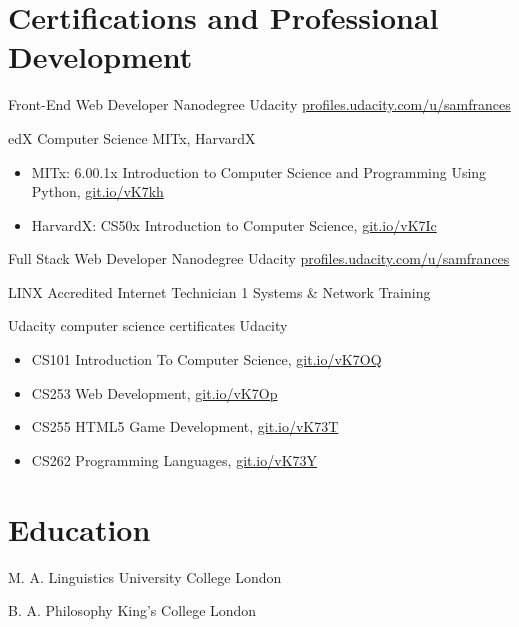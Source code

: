 \documentclass[10pt,a4paper,sans]{moderncv} %
\begin{document}

\section{Certifications and Professional Development}

    {Front-End Web Developer Nanodegree}
    {Udacity}{}
    { \href{ https://profiles.udacity.com/u/samfrances }{ profiles.udacity.com/u/samfrances } }
    {}

    {edX Computer Science}
    {MITx, HarvardX}{}
    {}
    {        \begin{itemize}
            \item{ MITx: 6.00.1x Introduction to Computer Science and Programming Using Python, \href{ https://git.io/vK7kh }{ git.io/vK7kh } }
            \item{ HarvardX: CS50x Introduction to Computer Science, \href{ https://git.io/vK7Ic }{ git.io/vK7Ic } }
        \end{itemize}
}

    {Full Stack Web Developer Nanodegree}
    {Udacity}{}
    { \href{ https://profiles.udacity.com/u/samfrances }{ profiles.udacity.com/u/samfrances } }
    {}

    {LINX Accredited Internet Technician 1}
    {Systems \& Network Training}{}
    {}
    {}

    {Udacity computer science certificates}
    {Udacity}{}
    {}
    {        \begin{itemize}
            \item{ CS101 Introduction To Computer Science, \href{ https://git.io/vK7OQ }{ git.io/vK7OQ } }
            \item{ CS253 Web Development, \href{ https://git.io/vK7Op }{ git.io/vK7Op } }
            \item{ CS255 HTML5 Game Development, \href{ https://git.io/vK73T }{ git.io/vK73T } }
            \item{ CS262 Programming Languages, \href{ https://git.io/vK73Y }{ git.io/vK73Y } }
        \end{itemize}
}



\section{Education}

    { M. A. Linguistics}
    { University College London }{}{}{}

    { B. A. Philosophy}
    { King's College London }{}{}{}
\end{document}

